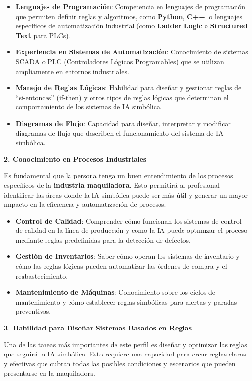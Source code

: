 \documentclass[
  10pt,
  letterpaper,
]{book}
\providecommand{\tightlist}{%
  \setlength{\itemsep}{0pt}\setlength{\parskip}{0pt}}\usepackage{longtable,booktabs,array}
\begin{document}
\begin{itemize}
\tightlist
\item
  \textbf{Lenguajes de Programación}: Competencia en lenguajes de
  programación que permiten definir reglas y algoritmos, como
  \textbf{Python}, \textbf{C++}, o lenguajes específicos de
  automatización industrial (como \textbf{Ladder Logic} o
  \textbf{Structured Text} para PLCs).
\item
  \textbf{Experiencia en Sistemas de Automatización}: Conocimiento de
  sistemas SCADA o PLC (Controladores Lógicos Programables) que se
  utilizan ampliamente en entornos industriales.
\item
  \textbf{Manejo de Reglas Lógicas}: Habilidad para diseñar y gestionar
  reglas de ``si-entonces'' (if-then) y otros tipos de reglas lógicas
  que determinan el comportamiento de los sistemas de IA simbólica.
\item
  \textbf{Diagramas de Flujo}: Capacidad para diseñar, interpretar y
  modificar diagramas de flujo que describen el funcionamiento del
  sistema de IA simbólica.
\end{itemize}

\textbf{2. Conocimiento en Procesos Industriales}

Es fundamental que la persona tenga un buen entendimiento de los
procesos específicos de la \textbf{industria maquiladora}. Esto
permitirá al profesional identificar las áreas donde la IA simbólica
puede ser más útil y generar un mayor impacto en la eficiencia y
automatización de procesos.

\begin{itemize}
\tightlist
\item
  \textbf{Control de Calidad}: Comprender cómo funcionan los sistemas de
  control de calidad en la línea de producción y cómo la IA puede
  optimizar el proceso mediante reglas predefinidas para la detección de
  defectos.
\item
  \textbf{Gestión de Inventarios}: Saber cómo operan los sistemas de
  inventario y cómo las reglas lógicas pueden automatizar las órdenes de
  compra y el reabastecimiento.
\item
  \textbf{Mantenimiento de Máquinas}: Conocimiento sobre los ciclos de
  mantenimiento y cómo establecer reglas simbólicas para alertas y
  paradas preventivas.
\end{itemize}

\textbf{3. Habilidad para Diseñar Sistemas Basados en Reglas}

Una de las tareas más importantes de este perfil es diseñar y optimizar
las reglas que seguirá la IA simbólica. Esto requiere una capacidad para
crear reglas claras y efectivas que cubran todas las posibles
condiciones y escenarios que pueden presentarse en la maquiladora.
\end{document}
